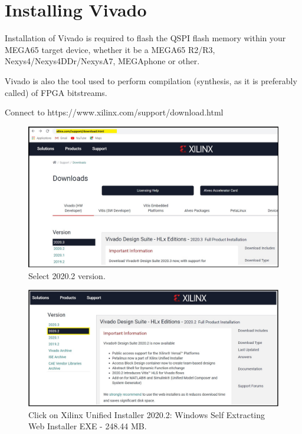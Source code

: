 \section{Installing Vivado}

Installation of Vivado is required to flash the QSPI flash memory within your MEGA65 target device, whether it be a MEGA65 R2/R3, Nexys4/Nexys4DDr/NexysA7, MEGAphone or other.

Vivado is also the tool used to perform compilation (synthesis, as it is preferably called) of FPGA bitstreams.

Connect to https://www.xilinx.com/support/download.html

\begin{figure}[H]
\centering
  \includegraphics[width=0.8\linewidth]{images/VivadoInstimg001.jpg}
  \captionsetup{width=0.8\linewidth}
  \caption{Select 2020.2 version.}
  \label{fig:VivadoInstimg001}
\end{figure}


\begin{figure}[H]
\centering
  \includegraphics[width=0.8\linewidth]{images/VivadoInstimg002.jpg}
  \captionsetup{width=0.8\linewidth}
  \caption{Click on Xilinx Unified Installer 2020.2: Windows Self Extracting Web Installer EXE - 248.44 MB.}
  \label{fig:VivadoInstimg002}
\end{figure}

